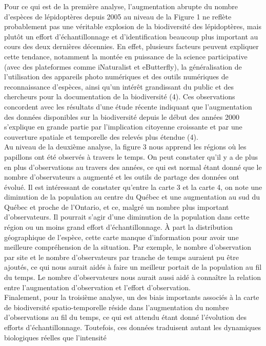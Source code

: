 \documentclass[9pt,twocolumn,twoside,]{pnas-new}
\begin{document}
Pour ce qui est de la première analyse, l'augmentation abrupte du nombre
d'espèces de lépidoptères depuis 2005 au niveau de la Figure 1 ne
reflète probablement pas une véritable explosion de la biodiversité des
lépidoptères, mais plutôt un effort d'échantillonnage et
d'identification beaucoup plus important au cours des deux dernières
décennies. En effet, plusieurs facteurs peuvent expliquer cette
tendance, notamment la montée en puissance de la science participative
(avec des plateformes comme iNaturalist et eButterfly), la
généralisation de l'utilisation des appareils photo numériques et des
outils numériques de reconnaissance d'espèces, ainsi qu'un intérêt
grandissant du public et des chercheurs pour la documentation de la
biodiversité (4). Ces observations concordent avec les résultats d'une
étude récente indiquant que l'augmentation des données disponibles sur
la biodiversité depuis le début des années 2000 s'explique en grande
partie par l'implication citoyenne croissante et par une couverture
spatiale et temporelle des relevés plus étendue (4).\\
Au niveau de la deuxième analyse, la figure 3 nous apprend les régions
où les papillons ont été observés à travers le temps. On peut constater
qu'il y a de plus en plus d'observations au travers des années, ce qui
est normal étant donné que le nombre d'observateurs a augmenté et les
outils de partage des données ont évolué. Il est intéressant de
constater qu'entre la carte 3 et la carte 4, on note une diminution de
la population au centre du Québec et une augmentation au sud du Québec
et proche de l'Ontario, et ce, malgré un nombre plus important
d'observateurs. Il pourrait s'agir d'une diminution de la population
dans cette région ou un moins grand effort d'échantillonnage. À part la
distribution géographique de l'espèce, cette carte manque d'information
pour avoir une meilleure compréhension de la situation. Par exemple, le
nombre d'observation par site et le nombre d'observateurs par tranche de
temps auraient pu être ajoutés, ce qui nous aurait aidés à faire un
meilleur portait de la population au fil du temps. Le nombre
d'observateurs nous aurait aussi aidé à connaître la relation entre
l'augmentation d'observation et l'effort d'observation.\\
Finalement, pour la troisième analyse, un des biais importants associés
à la carte de biodiversité spatio-temporelle réside dans l'augmentation
du nombre d'observations au fil du temps, ce qui est attendu étant donné
l'évolution des efforts d'échantillonnage. Toutefois, ces données
traduisent autant les dynamiques biologiques réelles que l'intensité
\end{document}
